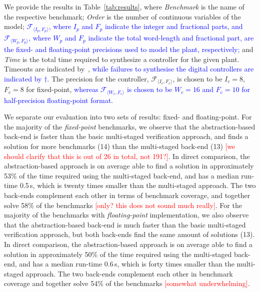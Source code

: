 \documentclass[twocolumn]{autart}    %
\newcommand{\xmark}{\ding{55}}
\renewcommand{\note}[1]{\textcolor{red}{[#1]}}
\begin{document}
We provide the results in Table~\ref{tab:results}, 
where \textit{Benchmark} is the name of the respective benchmark; 
\textit{Order} is the number of continuous variables of the model; \textcolor{blue}{ 
$\mathcal{F}_{\langle I_p,F_p \rangle}$, where $I_p$ and $F_p$ indicate the integer and fractional parts,  
and \textcolor{blue}{ $\mathcal{F}_{\langle W_p,F_p \rangle}$}, where $W_p$ and $F_p$ indicate the total word-length and fractional part, 
are the fixed- and floating-point precisions used to model the plant, respectively; } 
and \textit{Time} is the total time required to synthesize a controller for the given plant.    
Timeouts are indicated by~\xmark, \textcolor{blue}{while failures to synthesise the digital controllers are indicated by $\dagger$}.
The precision for the controller, $\mathcal{F}_{\langle I_c,F_c \rangle}$, is
chosen to be $I_c = 8$, $F_c = 8$ for fixed-point, \textcolor{blue}{whereas  
$\mathcal{F}_{\langle W_c, F_c \rangle}$ is chosen to be $W_c = 16$ and $F_c = 10$
for half-precision floating-point format}.

We separate our evaluation into two sets of results: fixed- and floating-point. 
For the majority of the {\it fixed-point} benchmarks, we observe that the abstraction-based
back-end is faster than the basic multi-staged verification approach, and
finds a solution for more benchmarks (14) than the multi-staged back-end (13) \note{we should clarify that this is out of 26 in total, not 191?}.  
In direct comparison, the abstraction-based approach is on average able to find a
solution in approximately 53\% of the time required using the multi-staged
back-end, and has a median run-time 0.5\,s, which is twenty times smaller
than the multi-staged approach.  The two back-ends complement each other in terms of 
benchmark coverage, and together solve 58\% of the benchmarks \note{only? this does not sound much really}.  
%
For the majority of the benchmarks with {\it floating-point} implementation, 
we also observe that the abstraction-based back-end is much faster than the basic multi-staged verification approach, 
but both back-ends find the same amount of solutions (13).  
In direct comparison, the abstraction-based approach is on average able to find a
solution in approximately 50\% of the time required using the multi-staged
back-end, and has a median run-time 0.6\,s, which is forty times smaller
than the multi-staged approach.  The two back-ends complement each other in
benchmark coverage and together solve 54\% of the benchmarks \note{somewhat underwhelming}.
\end{document}
